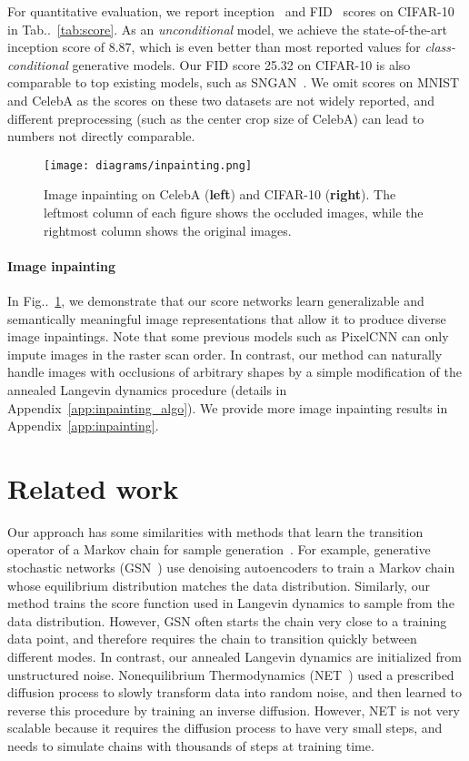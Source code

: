 \documentclass{article}
\makeatletter
\def\@onedot{\ifx\@let@token.\else.\null\fi\xspace}
\DeclareRobustCommand\onedot{\futurelet\@let@token\@onedot}
\newcommand{\figref}[1]{Fig\onedot~\ref{#1}}
\newcommand{\tabref}[1]{Tab\onedot~\ref{#1}}
\makeatother
\begin{document}
For quantitative evaluation, we report inception~\cite{salimans2016improved} and FID~\cite{heusel2017gans} scores on CIFAR-10 in \tabref{tab:score}. As an \emph{unconditional} model, we achieve the state-of-the-art inception score of 8.87, which is even better than most reported values for \emph{class-conditional} generative models. Our FID score 25.32 on CIFAR-10 is also comparable to top existing models, such as SNGAN~\cite{miyato2018spectral}. We omit scores on MNIST and CelebA as the scores on these two datasets are not widely reported, and different preprocessing (such as the center crop size of CelebA) can lead to numbers not directly comparable.

\begin{figure}
    \centering
    \texttt{[image: diagrams/inpainting.png]}
    \caption{Image inpainting on CelebA (\textbf{left}) and CIFAR-10 (\textbf{right}). The leftmost column of each figure shows the occluded images, while the rightmost column shows the original images.}
    \label{fig:inpainting}
\end{figure}
\paragraph{Image inpainting} In \figref{fig:inpainting}, we demonstrate that our score networks learn generalizable and semantically meaningful image representations that allow it to produce diverse image inpaintings. Note that some previous models such as PixelCNN can only impute images in the raster scan order. In contrast, our method can naturally handle images with occlusions of arbitrary shapes by a simple modification of the annealed Langevin dynamics procedure (details in Appendix~\ref{app:inpainting_algo}). We provide more image inpainting results in Appendix~\ref{app:inpainting}. 


 \section{Related work}

Our approach has some similarities with methods that learn the transition operator of a Markov chain for sample generation~\cite{bengio2013generalized,sohl2015deep,bordes2017learning,goyal2017variational,song2017nice}. For example, generative stochastic networks (GSN~\cite{bengio2013generalized,alain2016gsn}) use denoising autoencoders to train a Markov chain whose equilibrium distribution matches the data distribution. Similarly, our method trains the score function used in Langevin dynamics to sample from the data distribution. However, GSN often starts the chain very close to a training data point, and therefore requires the chain to transition quickly between different modes. In contrast, our annealed Langevin dynamics are initialized from unstructured noise. Nonequilibrium Thermodynamics (NET~\cite{sohl2015deep}) used a prescribed diffusion process to slowly transform data into random noise, and then learned to reverse this procedure by training an inverse diffusion. However, NET is not very scalable because it requires the diffusion process to have very small steps, and needs to simulate chains with thousands of steps at training time.
\end{document}
